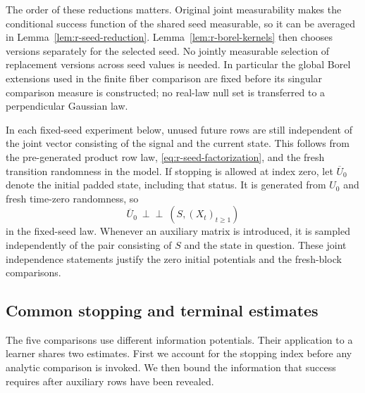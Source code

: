 The order of these reductions matters.  Original joint measurability
makes the conditional success function of the shared seed
measurable, so it can be averaged in Lemma~\ref{lem:r-seed-reduction}.
Lemma~\ref{lem:r-borel-kernels} then chooses versions separately for
the selected seed.  No jointly measurable selection of replacement
versions across seed values is needed.  In particular the global
Borel extensions used in the finite fiber comparison are fixed
before its singular comparison measure is constructed; no
real-law null set is transferred to a perpendicular Gaussian law.

In each fixed-seed experiment below, unused future rows are still
independent of the joint vector consisting of the signal and the
current state.  This follows from the pre-generated product row law,
\eqref{eq:r-seed-factorization}, and the fresh transition
randomness in the model.  If stopping is allowed at index zero,
let \(\overline U_0\) denote the initial padded state, including
that status.  It is generated from \(U_0\) and fresh time-zero
randomness, so
\[
 \overline U_0\ \perp\!\!\!\perp\
       (S,(X_t)_{t\ge1})
\]
in the fixed-seed law.  Whenever an auxiliary matrix is introduced,
it is sampled independently of the pair consisting of \(S\) and
the state in question.  These joint independence statements justify
the zero initial potentials and the fresh-block comparisons.

\subsection{Common stopping and terminal estimates}
\label{subsec:r-stopping-reduction}

The five comparisons use different information potentials.  Their
application to a learner shares two estimates.  First we account for
the stopping index before any analytic comparison is invoked.  We then
bound the information that success requires after auxiliary rows have
been revealed.

